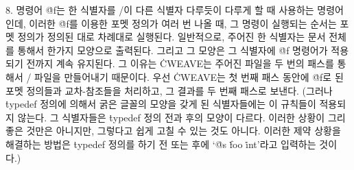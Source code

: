 8. 명령어 \.{@f}는 한 식별자를 \TEX/이 다른 식별자 다루듯이 다루게
할 때 사용하는 명령어인데, 이러한 \.{@f}를 이용한 포멧 정의가  여러 번
나올 때, 그 명령이 실행되는 순서는 포멧 정의가 정의된 대로 차례대로
실행된다. 일반적으로, 주어진 한 식별자는 문서 전체를 통해서 한가지
모양으로 출력된다. 그리고 그 모양은 그 식별자에 \.{@f} 명령어가
적용되기 전까지 계속 유지된다. 그 이유는 \.{CWEAVE}는 주어진 파일을 두
번의 패스를 통해서 \TEX/ 파일을 만들어내기
때문이다. 우선 \.{CWEAVE}는 첫 번째 패스 동안에 \.{@f}로 된 포멧 정의들과
교차-참조들을 처리하고, 그 결과를 두 번째 패스로
보낸다. (그러나 \.{typedef} 정의에 의해서 굵은 글꼴의 모양을 갖게 된
식별자들에는 이 규칙들이 적용되지 않는다. 그 식별자들은 \.{typedef}
정의 전과 후의 모양이 다르다. 이러한 상황이 그리 좋은 것만은 아니지만,
그렇다고 쉽게 고칠 수 있는 것도 아니다. 이러한 제약 상황을 해결하는
방법은 \.{typedef} 정의를 하기 전 또는 후에
`\.{@s} \.{foo} \.{int}'라고 입력하는 것이다.)

